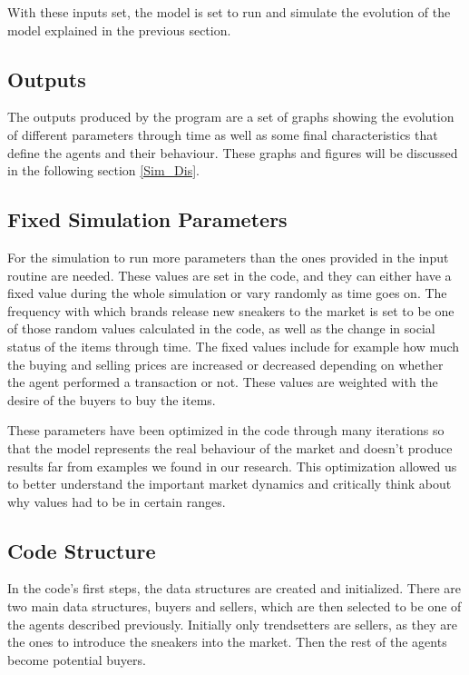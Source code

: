 \documentclass[12pt]{article}
\begin{document}
With these inputs set, the model is set to run and simulate the evolution of the model explained in the previous section.

\subsection{Outputs}

The outputs produced by the program are a set of graphs showing the evolution of different parameters through time as well as some final characteristics that define the agents and their behaviour. These graphs and figures will be discussed in the following section \ref{Sim_Dis}.

\subsection{Fixed Simulation Parameters}

For the simulation to run more parameters than the ones provided in the input routine are needed. These values are set in the code, and they can either have a fixed value during the whole simulation or vary randomly as time goes on. The frequency with which brands release new sneakers to the market is set to be one of those random values calculated in the code, as well as the change in social status of the items through time. The fixed values include for example how much the buying and selling prices are increased or decreased depending on whether the agent performed a transaction or not. These values are weighted with the desire of the buyers to buy the items.

These parameters have been optimized in the code through many iterations so that the model represents the real behaviour of the market and doesn't produce results far from examples we found in our research. This optimization allowed us to better understand the important market dynamics and critically think about why values had to be in certain ranges.

\subsection{Code Structure}
In the code's first steps, the data structures are created and initialized. There are two main data structures, buyers and sellers, which are then selected to be one of the agents described previously. Initially only trendsetters are sellers, as they are the ones to introduce the sneakers into the market. Then the rest of the agents become potential buyers.
\end{document}
